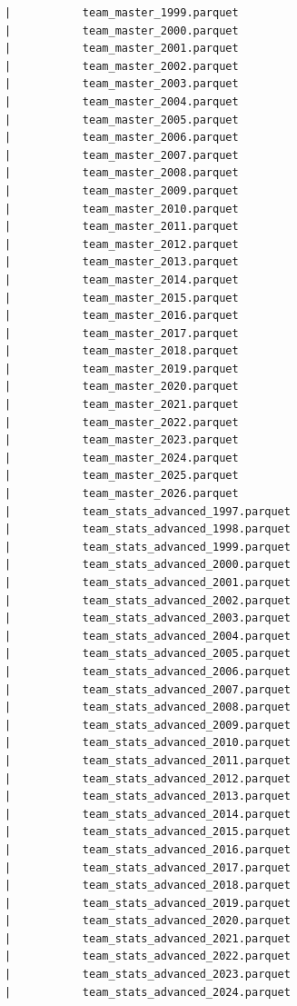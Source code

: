 \begin{lstlisting}
      |           team_master_1999.parquet
      |           team_master_2000.parquet
      |           team_master_2001.parquet
      |           team_master_2002.parquet
      |           team_master_2003.parquet
      |           team_master_2004.parquet
      |           team_master_2005.parquet
      |           team_master_2006.parquet
      |           team_master_2007.parquet
      |           team_master_2008.parquet
      |           team_master_2009.parquet
      |           team_master_2010.parquet
      |           team_master_2011.parquet
      |           team_master_2012.parquet
      |           team_master_2013.parquet
      |           team_master_2014.parquet
      |           team_master_2015.parquet
      |           team_master_2016.parquet
      |           team_master_2017.parquet
      |           team_master_2018.parquet
      |           team_master_2019.parquet
      |           team_master_2020.parquet
      |           team_master_2021.parquet
      |           team_master_2022.parquet
      |           team_master_2023.parquet
      |           team_master_2024.parquet
      |           team_master_2025.parquet
      |           team_master_2026.parquet
      |           team_stats_advanced_1997.parquet
      |           team_stats_advanced_1998.parquet
      |           team_stats_advanced_1999.parquet
      |           team_stats_advanced_2000.parquet
      |           team_stats_advanced_2001.parquet
      |           team_stats_advanced_2002.parquet
      |           team_stats_advanced_2003.parquet
      |           team_stats_advanced_2004.parquet
      |           team_stats_advanced_2005.parquet
      |           team_stats_advanced_2006.parquet
      |           team_stats_advanced_2007.parquet
      |           team_stats_advanced_2008.parquet
      |           team_stats_advanced_2009.parquet
      |           team_stats_advanced_2010.parquet
      |           team_stats_advanced_2011.parquet
      |           team_stats_advanced_2012.parquet
      |           team_stats_advanced_2013.parquet
      |           team_stats_advanced_2014.parquet
      |           team_stats_advanced_2015.parquet
      |           team_stats_advanced_2016.parquet
      |           team_stats_advanced_2017.parquet
      |           team_stats_advanced_2018.parquet
      |           team_stats_advanced_2019.parquet
      |           team_stats_advanced_2020.parquet
      |           team_stats_advanced_2021.parquet
      |           team_stats_advanced_2022.parquet
      |           team_stats_advanced_2023.parquet
      |           team_stats_advanced_2024.parquet

\end{lstlisting}
